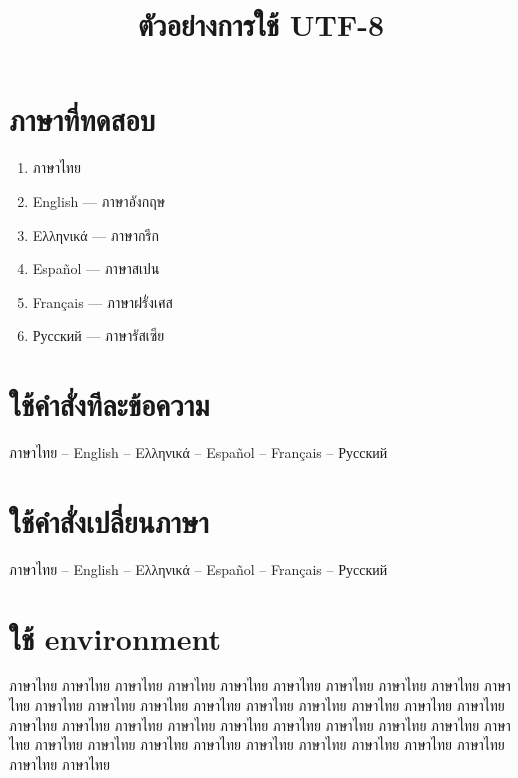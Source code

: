 \documentclass{article}
\begin{document}
\title{ตัวอย่างการใช้ UTF-8}

\maketitle

\section{ภาษาที่ทดสอบ}

\begin{enumerate}
  \item ภาษาไทย
  \item \foreignlanguage{english}{English} --- ภาษาอังกฤษ
  \item \foreignlanguage{greek}{Ελληνικά} --- ภาษากรีก
  \item \foreignlanguage{spanish}{Español} --- ภาษาสเปน
  \item \foreignlanguage{french}{Français} --- ภาษาฝรั่งเศส
  \item \foreignlanguage{russian}{Русский} --- ภาษารัสเซีย
\end{enumerate}

\section{ใช้คำสั่งทีละข้อความ}

ภาษาไทย -- \foreignlanguage{english}{English} --
\foreignlanguage{greek}{Ελληνικά} -- \foreignlanguage{spanish}{Español} --
\foreignlanguage{french}{Français} -- \foreignlanguage{russian}{Русский}

\section{ใช้คำสั่งเปลี่ยนภาษา}

ภาษาไทย --  English  --
 Ελληνικά  --
 Español  --
 Français  --
 Русский 

\section{ใช้ environment}

ภาษาไทย ภาษาไทย ภาษาไทย ภาษาไทย ภาษาไทย ภาษาไทย ภาษาไทย ภาษาไทย ภาษาไทย ภาษาไทย 
ภาษาไทย ภาษาไทย ภาษาไทย ภาษาไทย ภาษาไทย ภาษาไทย ภาษาไทย ภาษาไทย ภาษาไทย ภาษาไทย 
ภาษาไทย ภาษาไทย ภาษาไทย ภาษาไทย ภาษาไทย ภาษาไทย ภาษาไทย ภาษาไทย ภาษาไทย ภาษาไทย 
ภาษาไทย ภาษาไทย ภาษาไทย ภาษาไทย ภาษาไทย ภาษาไทย ภาษาไทย ภาษาไทย ภาษาไทย ภาษาไทย 
\end{document}
